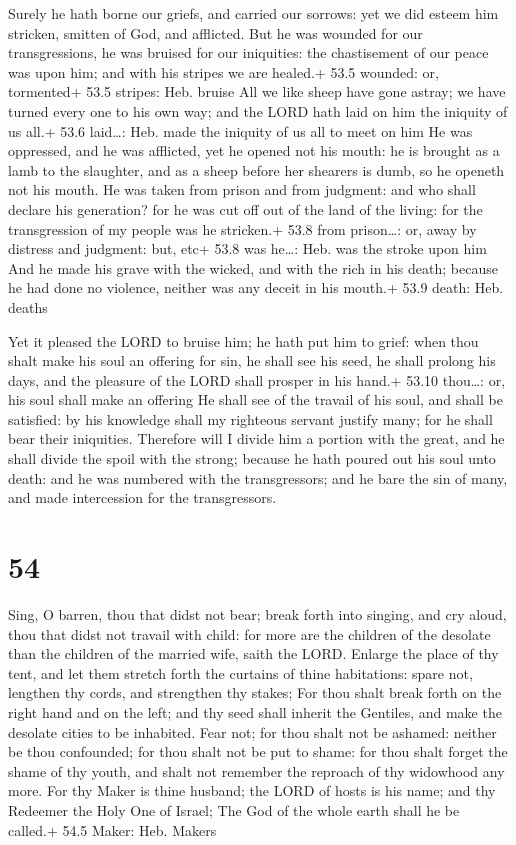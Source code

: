  Surely he hath borne our griefs, and carried our sorrows:
yet we did esteem him stricken, smitten of God, and afflicted.
 But he was wounded for our transgressions, he was bruised
for our iniquities: the chastisement of our peace was upon him; and with
his stripes we are healed.+ 53.5 wounded: or, tormented+ 53.5 stripes:
Heb. bruise  All we like sheep have gone astray; we have
turned every one to his own way; and the LORD hath laid on him the
iniquity of us all.+ 53.6 laid\ldots: Heb. made the iniquity of us all
to meet on him  He was oppressed, and he was afflicted, yet
he opened not his mouth: he is brought as a lamb to the slaughter, and
as a sheep before her shearers is dumb, so he openeth not his mouth.
 He was taken from prison and from judgment: and who shall
declare his generation? for he was cut off out of the land of the
living: for the transgression of my people was he stricken.+ 53.8 from
prison\ldots: or, away by distress and judgment: but, etc+ 53.8 was
he\ldots: Heb. was the stroke upon him  And he made his
grave with the wicked, and with the rich in his death; because he had
done no violence, neither was any deceit in his mouth.+ 53.9 death: Heb.
deaths

 Yet it pleased the LORD to bruise him; he hath put him
to grief: when thou shalt make his soul an offering for sin, he shall
see his seed, he shall prolong his days, and the pleasure of the LORD
shall prosper in his hand.+ 53.10 thou\ldots: or, his soul shall make an
offering  He shall see of the travail of his soul, and
shall be satisfied: by his knowledge shall my righteous servant justify
many; for he shall bear their iniquities.  Therefore will I
divide him a portion with the great, and he shall divide the spoil with
the strong; because he hath poured out his soul unto death: and he was
numbered with the transgressors; and he bare the sin of many, and made
intercession for the transgressors.

\hypertarget{section-53}{%
\section{54}\label{section-53}}

 Sing, O barren, thou that didst not bear; break forth into
singing, and cry aloud, thou that didst not travail with child: for more
are the children of the desolate than the children of the married wife,
saith the LORD.  Enlarge the place of thy tent, and let them
stretch forth the curtains of thine habitations: spare not, lengthen thy
cords, and strengthen thy stakes;  For thou shalt break
forth on the right hand and on the left; and thy seed shall inherit the
Gentiles, and make the desolate cities to be inhabited. 
Fear not; for thou shalt not be ashamed: neither be thou confounded; for
thou shalt not be put to shame: for thou shalt forget the shame of thy
youth, and shalt not remember the reproach of thy widowhood any more.
 For thy Maker is thine husband; the LORD of hosts is his
name; and thy Redeemer the Holy One of Israel; The God of the whole
earth shall he be called.+ 54.5 Maker: Heb. Makers

